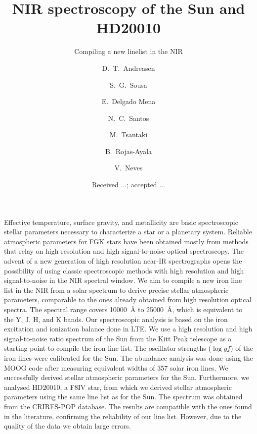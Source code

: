 \documentclass{aa}
\begin{document}
\title{NIR spectroscopy of the Sun and HD20010}
\subtitle{Compiling a new linelist in the NIR}


\author{ D.~T.~Andreasen
    \and S.~G.~Sousa
    \and E.~Delgado Mena
    \and N.~C.~Santos
    \and M.~Tsantaki
    \and B.~Rojas-Ayala
    \and V.~Neves}







\date{Received ...; accepted ...}

\abstract
{Effective temperature, surface gravity, and metallicity are basic
spectroscopic stellar parameters necessary to characterize
a star or a planetary system. Reliable atmospheric parameters for
FGK stars have been obtained mostly from methods that relay on high
resolution and high signal-to-noise optical spectroscopy. The
advent of a new generation of high resolution near-IR spectrographs
opens the possibility of using classic spectroscopic methods with
high resolution and high signal-to-noise in the NIR spectral window.}
{We aim to compile a new iron line list in the NIR from a solar
spectrum to derive precise stellar atmospheric parameters,
comparable to the ones already obtained from high resolution optical
spectra. The spectral range covers \SI{10000}{\angstrom} to
\SI{25000}{\angstrom}, which is equivalent to the Y, J, H, and K bands.}
{Our spectroscopic analysis is based on the iron excitation and
ionization balance done in LTE. We
use a high resolution and high signal-to-noise ratio spectrum of the Sun
from the Kitt Peak telescope as a starting point to compile the iron
line list. The oscillator strengths ($\log\mathit{gf}$) of the iron lines were calibrated for the Sun.
The abundance analysis was done using
the MOOG code after measuring equivalent widths of 357 solar iron lines.}
{We successfully derived stellar atmospheric parameters for the
Sun.
Furthermore, we analysed
HD20010, a F8IV star, from which we derived stellar atmospheric
parameters using the same line list as for the Sun. The spectrum
was obtained from the CRIRES-POP database.
The results are compatible with the ones found in the literature,
confirming the reliability of our line list. However, due to the
quality of the data we obtain large errors.}
{}
\end{document}
